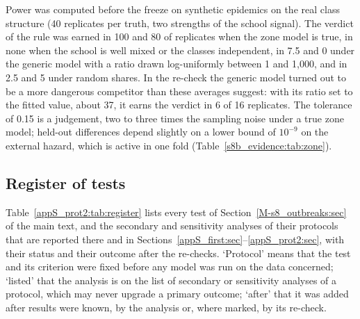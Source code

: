 Power was computed before the freeze on synthetic epidemics on the real class structure (40 replicates per
truth, two strengths of the school signal). The verdict of the rule was earned in 100\pct{} and 80\pct{} of
replicates when the zone model is true, in none when the school is well mixed or the classes independent, in
7.5\pct{} and 0\pct{} under the generic model with a ratio drawn log-uniformly between 1 and 1{,}000, and in 2.5
and 5\pct{} under random shares. In the re-check the generic model turned out to be a more dangerous
competitor than these averages suggest: with its ratio set to the fitted value, about 37, it earns the verdict
in 6 of 16 replicates. The tolerance of 0.15 is a judgement, two to three times the sampling noise under a
true zone model; held-out differences depend slightly on a lower bound of $10^{-9}$ on the external hazard,
which is active in one fold (Table~\ref{s8b_evidence:tab:zone}).

\subsection{Register of tests}\label{appS_prot2:sec:register}

Table~\ref{appS_prot2:tab:register} lists every test of Section~\ref{M-s8_outbreaks:sec} of the main text, and the secondary and sensitivity
analyses of their protocols that are reported there and in Sections~\ref{appS_first:sec}--\ref{appS_prot2:sec},
with their status and their outcome after the re-checks. `Protocol' means that the test and its criterion were fixed before any model was run on
the data concerned; `listed' that the analysis is on the list of secondary or sensitivity analyses of a
protocol, which may never upgrade a primary outcome; `after' that it was added after results were known, by
the analysis or, where marked, by its re-check.

